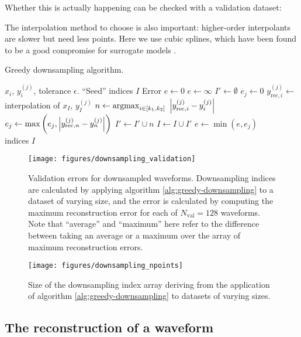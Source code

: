 \documentclass[main.tex]{subfiles}
\begin{document}
Whether this is actually happening can be checked with a validation dataset: 

The interpolation method to choose is also important: higher-order interpolants are slower but need less points.
Here we use cubic splines, which have been found to be a good compromise for surrogate models \cite{lackeySurrogateModelAlignedspin2019}.


\begin{algorithm}
\caption{Greedy downsampling algorithm. }\label{alg:greedy-downsampling}
\begin{algorithmic}
\Require \(x_i\), \(y_i^{(j)}\), tolerance \(\epsilon \).
\Require ``Seed'' indices \(I\)
\State Error \(e \gets 0\)
\State \(e \gets \infty \)
\State \(I' \gets \emptyset\)
\State \( e_j \gets 0\)
\State \(y_{\text{rec}, i}^{(j)} \gets\) interpolation of \(x_I\), \(y_I^{(j)}\)
\State \(n \gets \operatorname{argmax}_{i \in [k_1 , k_2 ]} \ \abs{y _{\text{rec}, i}^{(j)} - y_{i}^{(j)}}\)
\State \(e_j \gets \max \left( e_j, \abs{y _{\text{rec}, n}^{(j)} - y_{n}^{(j)}}\right)\)
\State \(I' \gets I' \cup n\)
\EndIf
\State \(I \gets I \cup I'\)
\EndFor
\State \(e \gets \min (e, e_j)\)
\EndFor
\EndWhile \\
\Return indices \(I\)
\end{algorithmic}
\end{algorithm}

\begin{figure}[ht]
\centering
\texttt{[image: figures/downsampling\_validation]}
\caption{Validation errors for downsampled waveforms. Downsampling indices are calculated by applying algorithm \ref{alg:greedy-downsampling} to a dataset of varying size, and the error is calculated by computing the maximum reconstruction error for each of \(N _{\text{val}} = 128\) waveforms. Note that ``average'' and ``maximum'' here refer to the difference between taking an average or a maximum over the array of maximum reconstruction errors. }
\label{fig:downsampling_validation}
\end{figure}

\begin{figure}[ht]
\centering
\texttt{[image: figures/downsampling\_npoints]}
\caption{Size of the downsampling index array deriving from the application of algorithm \ref{alg:greedy-downsampling} to datasets of varying sizes.}
\label{fig:downsampling_npoints}
\end{figure}

\subsection{The reconstruction of a waveform}

\end{document}
